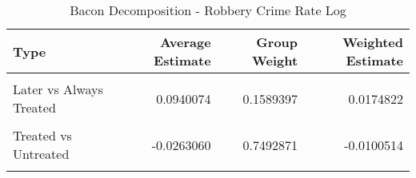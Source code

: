 \begin{table}[H]

\caption{\label{tab:tab:bacondecompositionRobbery}Bacon Decomposition - Robbery Crime Rate Log}
\centering
\begin{tabular}[t]{lrrr}
\toprule
Type & Average Estimate & Group Weight & Weighted Estimate\\
\midrule
\cellcolor{gray!6}{Earlier vs Later Treated} & \cellcolor{gray!6}{0.0961047} & \cellcolor{gray!6}{0.0683810} & \cellcolor{gray!6}{0.0073682}\\
Later vs Always Treated & 0.0940074 & 0.1589397 & 0.0174822\\
\cellcolor{gray!6}{Later vs Earlier Treated} & \cellcolor{gray!6}{0.1505417} & \cellcolor{gray!6}{0.0233921} & \cellcolor{gray!6}{0.0020947}\\
Treated vs Untreated & -0.0263060 & 0.7492871 & -0.0100514\\
\cellcolor{gray!6}{Total TWFE} & \cellcolor{gray!6}{NaN} & \cellcolor{gray!6}{NaN} & \cellcolor{gray!6}{0.0168936}\\
\bottomrule
\end{tabular}
\end{table}
